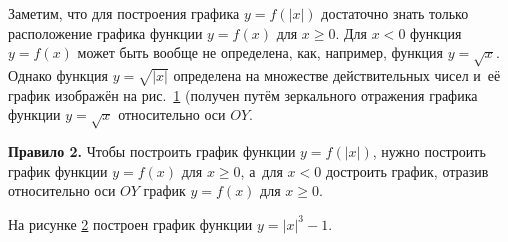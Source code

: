 Заметим, что для построения графика $y = f(|x|)$ достаточно знать только
расположение графика функции $y = f(x)$ для $x \geqslant 0$.
Для $x < 0$ функция $y = f(x)$ может быть вообще не определена, как,
например, функция $y = \sqrt{x}$. Однако функция $y = \sqrt{|x|}$
определена на множестве действительных чисел и~её график изображён
на рис.\ \ref{fig_1_12_38} (получен путём зеркального отражения графика функции $y = \sqrt{x}$
относительно оси $OY$.

\begin{figure}\label{fig_1_12_38}
\end{figure}

\textbf{Правило 2.} Чтобы построить график функции $y = f(|x|)$, нужно построить
график функции $y = f(x)$ для $x \geqslant 0$, а~для $x < 0$ достроить график,
отразив относительно оси $OY$ график $y = f(x)$ для $x \geqslant 0$.

\begin{figure}
\end{figure}

На рисунке \ref{fig_1_12_39} построен график функции $y = |x|^{3} - 1$.

\begin{figure}\label{fig_1_12_39}
\end{figure}

